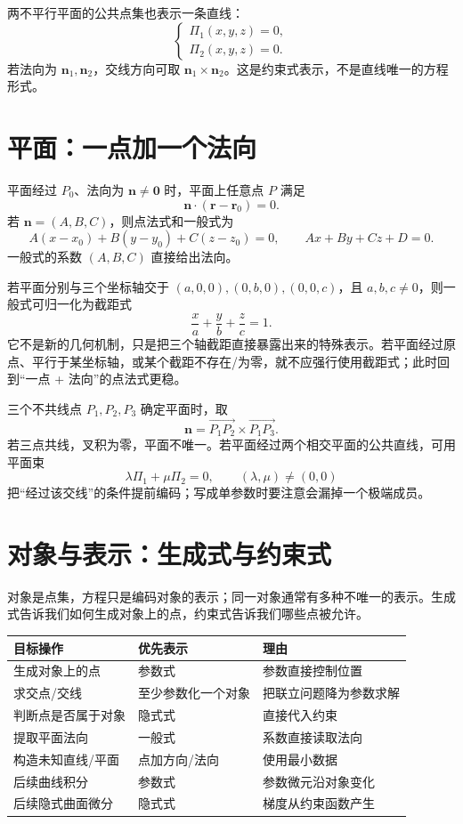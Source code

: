 \documentclass[11pt,a4paper]{ctexart}
\begin{document}
两不平行平面的公共点集也表示一条直线：
\[
\begin{cases}\Pi_1(x,y,z)=0,\\\Pi_2(x,y,z)=0.\end{cases}
\]
若法向为 $\mathbf n_1,\mathbf n_2$，交线方向可取 $\mathbf n_1\times\mathbf n_2$。这是约束式表示，不是直线唯一的方程形式。

\section{平面：一点加一个法向}

平面经过 $P_0$、法向为 $\mathbf n\ne\mathbf0$ 时，平面上任意点 $P$ 满足
\[
\boxed{\mathbf n\cdot(\mathbf r-\mathbf r_0)=0}.
\]
若 $\mathbf n=(A,B,C)$，则点法式和一般式为
\[
A(x-x_0)+B(y-y_0)+C(z-z_0)=0,
\qquad Ax+By+Cz+D=0.
\]
一般式的系数 $(A,B,C)$ 直接给出法向。

若平面分别与三个坐标轴交于 $(a,0,0),(0,b,0),(0,0,c)$，且 $a,b,c\ne0$，则一般式可归一化为截距式
\[
\boxed{\frac{x}{a}+\frac{y}{b}+\frac{z}{c}=1}.
\]
它不是新的几何机制，只是把三个轴截距直接暴露出来的特殊表示。若平面经过原点、平行于某坐标轴，或某个截距不存在/为零，就不应强行使用截距式；此时回到“一点 + 法向”的点法式更稳。

三个不共线点 $P_1,P_2,P_3$ 确定平面时，取
\[
\mathbf n=\overrightarrow{P_1P_2}\times\overrightarrow{P_1P_3}.
\]
若三点共线，叉积为零，平面不唯一。若平面经过两个相交平面的公共直线，可用平面束
\[
\lambda\Pi_1+\mu\Pi_2=0,\qquad(\lambda,\mu)\ne(0,0)
\]
把“经过该交线”的条件提前编码；写成单参数时要注意会漏掉一个极端成员。

\section{对象与表示：生成式与约束式}

对象是点集，方程只是编码对象的表示；同一对象通常有多种不唯一的表示。生成式告诉我们如何生成对象上的点，约束式告诉我们哪些点被允许。

\begin{center}
\begin{tabular}{L{3.0cm}L{3.1cm}L{\dimexpr\linewidth-6.1cm\relax}}
\toprule
目标操作 & 优先表示 & 理由\\
\midrule
生成对象上的点 & 参数式 & 参数直接控制位置\\
求交点/交线 & 至少参数化一个对象 & 把联立问题降为参数求解\\
判断点是否属于对象 & 隐式式 & 直接代入约束\\
提取平面法向 & 一般式 & 系数直接读取法向\\
构造未知直线/平面 & 点加方向/法向 & 使用最小数据\\
后续曲线积分 & 参数式 & 参数微元沿对象变化\\
后续隐式曲面微分 & 隐式式 & 梯度从约束函数产生\\
\bottomrule
\end{tabular}
\end{center}
\end{document}
